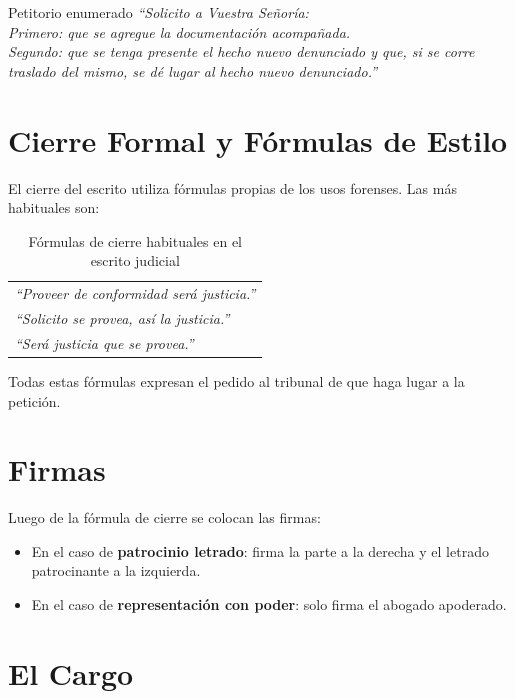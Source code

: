 \documentclass[12pt,oneside]{book}
\begin{document}
\begin{example}{Petitorio enumerado}
\textit{``Solicito a Vuestra Señoría:}\\
\textit{Primero: que se agregue la documentación acompañada.}\\
\textit{Segundo: que se tenga presente el hecho nuevo denunciado y que, si se corre traslado del mismo, se dé lugar al hecho nuevo denunciado.''}
\end{example}

\section{Cierre Formal y Fórmulas de Estilo}

El cierre del escrito utiliza fórmulas propias de los usos forenses. Las más habituales son:

\begin{table}[H]
\centering
\caption{Fórmulas de cierre habituales en el escrito judicial}
\begin{tabularx}{\textwidth}{X}
\toprule
\textit{``Proveer de conformidad será justicia.''} \\
\textit{``Solicito se provea, así la justicia.''} \\
\textit{``Será justicia que se provea.''} \\
\bottomrule
\end{tabularx}
\end{table}

Todas estas fórmulas expresan el pedido al tribunal de que haga lugar a la petición.

\section{Firmas}

Luego de la fórmula de cierre se colocan las firmas:

\begin{itemize}
    \item En el caso de \textbf{patrocinio letrado}: firma la parte a la derecha y el letrado patrocinante a la izquierda.
    \item En el caso de \textbf{representación con poder}: solo firma el abogado apoderado.
\end{itemize}

\section{El Cargo}
\end{document}
